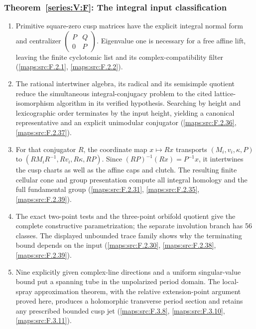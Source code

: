 \hypertarget{outline-V-F}{}
\subsubsection*{Theorem~\ref{series:V:F}: The integral input classification}
\begin{enumerate}[label=\arabic*.,leftmargin=*]
\item\hypertarget{step-V-F-1}{} Primitive square-zero cusp matrices have the explicit integral
  normal form and centralizer
  $\left(\begin{smallmatrix}P&Q\\0&P\end{smallmatrix}\right)$.
  Eigenvalue one is necessary for a free affine lift, leaving the
  finite cyclotomic list and its complex-compatibility filter
  (\cref{maps:src:F.2.1}, \cref{maps:src:F.2.2}).

\item\hypertarget{step-V-F-2}{} The rational intertwiner algebra, its radical and its
  semisimple quotient reduce the simultaneous integral-conjugacy
  problem to the cited lattice-isomorphism algorithm in its verified
  hypothesis.  Searching by height and lexicographic order terminates
  by the input height, yielding a canonical representative and an
  explicit unimodular conjugator (\cref{maps:src:F.2.36}, \cref{maps:src:F.2.37}).

\item\hypertarget{step-V-F-3}{} For that conjugator $R$, the coordinate map $x\mapsto Rx$
  transports $(M_i,v_i,\kappa,P)$ to
  $(RM_iR^{-1},Rv_i,R\kappa,RP)$.  Since
  $(RP)^{-1}(Rx)=P^{-1}x$, it intertwines the cusp charts
  as well as the affine caps and clutch.  The resulting finite
  cellular cone and group presentation compute all integral homology
  and the full fundamental group (\cref{maps:src:F.2.31}, \cref{maps:src:F.2.35}, \cref{maps:src:F.2.39}).

\item\hypertarget{step-V-F-4}{} The exact two-point tests and the three-point
  orbifold quotient give the complete constructive parametrization;
  the separate involution branch has 56 classes.  The displayed
  unbounded trace family shows why the terminating bound depends on
  the input (\cref{maps:src:F.2.30}, \cref{maps:src:F.2.38}, \cref{maps:src:F.2.39}).

\item\hypertarget{step-V-F-5}{} Nine explicitly given complex-line directions and a uniform
  singular-value bound put a spanning tube in the unpolarized period
  domain.  The local-spray approximation theorem, with the
  relative extension-point argument proved here, produces a
  holomorphic transverse period section and retains any prescribed
  bounded cusp jet (\cref{maps:src:F.3.8}, \cref{maps:src:F.3.10}, \cref{maps:src:F.3.11}).


\end{enumerate}
